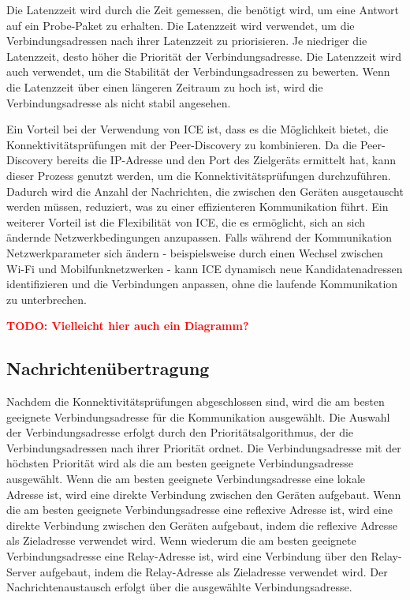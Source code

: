 Die Latenzzeit wird durch die Zeit gemessen, die benötigt wird, um eine Antwort auf ein Probe-Paket zu erhalten. Die Latenzzeit wird verwendet, um die Verbindungsadressen nach ihrer Latenzzeit zu priorisieren. Je niedriger die Latenzzeit, desto höher die Priorität der Verbindungsadresse. Die Latenzzeit wird auch verwendet, um die Stabilität der Verbindungsadressen zu bewerten. Wenn die Latenzzeit über einen längeren Zeitraum zu hoch ist, wird die Verbindungsadresse als nicht stabil angesehen. 

Ein Vorteil bei der Verwendung von ICE ist, dass es die Möglichkeit bietet, die Konnektivitätsprüfungen mit der Peer-Discovery zu kombinieren. Da die Peer-Discovery bereits die IP-Adresse und den Port des Zielgeräts ermittelt hat, kann dieser Prozess genutzt werden, um die Konnektivitätsprüfungen durchzuführen. Dadurch wird die Anzahl der Nachrichten, die zwischen den Geräten ausgetauscht werden müssen, reduziert, was zu einer effizienteren Kommunikation führt. Ein weiterer Vorteil ist die Flexibilität von ICE, die es ermöglicht, sich an sich ändernde Netzwerkbedingungen anzupassen. Falls während der Kommunikation Netzwerkparameter sich ändern - beispielsweise durch einen Wechsel zwischen Wi-Fi und Mobilfunknetzwerken - kann ICE dynamisch neue Kandidatenadressen identifizieren und die Verbindungen anpassen, ohne die laufende Kommunikation zu unterbrechen.

\textbf{\textcolor{red}{TODO: Vielleicht hier auch ein Diagramm?}}

\subsection{Nachrichtenübertragung}

Nachdem die Konnektivitätsprüfungen abgeschlossen sind, wird die am besten geeignete Verbindungsadresse für die Kommunikation ausgewählt. Die Auswahl der Verbindungsadresse erfolgt durch den Prioritätsalgorithmus, der die Verbindungsadressen nach ihrer Priorität ordnet. Die Verbindungsadresse mit der höchsten Priorität wird als die am besten geeignete Verbindungsadresse ausgewählt. Wenn die am besten geeignete Verbindungsadresse eine lokale Adresse ist, wird eine direkte Verbindung zwischen den Geräten aufgebaut. Wenn die am besten geeignete Verbindungsadresse eine reflexive Adresse ist, wird eine direkte Verbindung zwischen den Geräten aufgebaut, indem die reflexive Adresse als Zieladresse verwendet wird. Wenn wiederum die am besten geeignete Verbindungsadresse eine Relay-Adresse ist, wird eine Verbindung über den Relay-Server aufgebaut, indem die Relay-Adresse als Zieladresse verwendet wird. Der Nachrichtenaustausch erfolgt über die ausgewählte Verbindungsadresse. 

